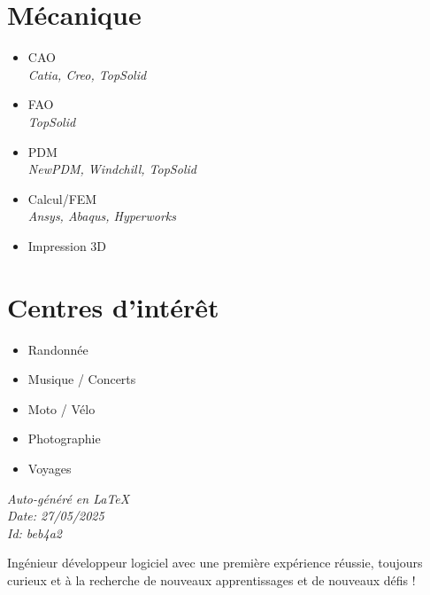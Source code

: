 \documentclass[]{friggeri-cv}
\begin{document}
\begin{aside}
\section{Mécanique}
\begin{itemize}
\item CAO
 \\ \hspace*{0.2em}\small\textit{Catia, Creo, TopSolid}
\item FAO
 \\ \hspace*{0.2em}\small\textit{TopSolid}
\item PDM
 \\ \hspace*{0.2em}\small\textit{NewPDM, Windchill, TopSolid}
\item Calcul/FEM
 \\ \hspace*{0.2em}\small\textit{Ansys, Abaqus, Hyperworks}
\item Impression 3D
\end{itemize}
\section{Centres d'intérêt}
\begin{itemize}
\item Randonnée
\item Musique / Concerts
\item Moto / Vélo
\item Photographie
\item Voyages
\end{itemize}
\vspace{2.5mm}%
\small \emph{Auto-généré en \LaTeX}\\
\small \emph{Date: 27/05/2025} \hspace*{8mm}\\
\small \emph{Id: beb4a2} %

\end{aside}

\vspace*{-2.0mm}
\noindent\parbox{\linewidth}{
  \centering
  Ingénieur développeur logiciel avec une première expérience réussie, toujours curieux et à la recherche de nouveaux apprentissages et de nouveaux défis !
}
\vspace*{0.8mm}
\end{document}
